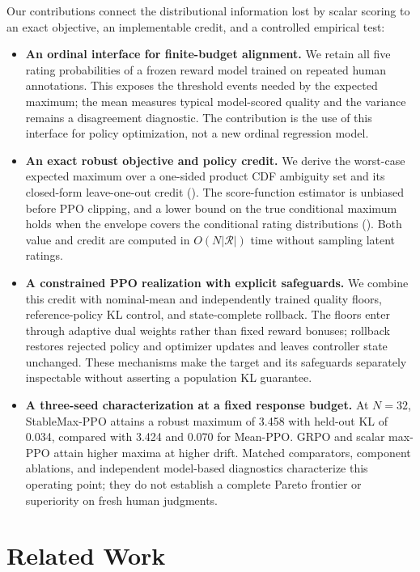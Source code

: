 \documentclass{article}
\newcommand{\method}{StableMax-PPO}
\theoremstyle{definition}
\theoremstyle{remark}
\begin{document}
Our contributions connect the distributional information lost by scalar scoring
to an exact objective, an implementable credit, and a controlled empirical test:
\begin{itemize}
\item \textbf{An ordinal interface for finite-budget alignment.}
We retain all five rating probabilities of a frozen reward model trained on
repeated human annotations. This exposes the threshold events needed by the
expected maximum; the mean measures typical model-scored quality and the
variance remains a disagreement diagnostic. The contribution is the use of
this interface for policy optimization, not a new ordinal regression model.

\item \textbf{An exact robust objective and policy credit.}
We derive the worst-case expected maximum over a one-sided product CDF
ambiguity set and its closed-form leave-one-out credit
(). The score-function estimator is
unbiased before PPO clipping, and a lower bound on the true conditional maximum
holds when the envelope covers the conditional rating distributions
(). Both value and credit are computed in
\(O(N|\mathcal R|)\) time without sampling latent ratings.

\item \textbf{A constrained PPO realization with explicit safeguards.}
We combine this credit with nominal-mean and independently trained quality
floors, reference-policy KL control, and state-complete rollback. The floors
enter through adaptive dual weights rather than fixed reward bonuses;
rollback restores rejected policy and optimizer updates and leaves controller
state unchanged. These mechanisms make the target and its safeguards
separately inspectable without asserting a population KL guarantee.

\item \textbf{A three-seed characterization at a fixed response budget.}
At \(N=32\), \method{} attains a robust maximum of 3.458 with held-out KL
of 0.034, compared with 3.424 and 0.070 for Mean-PPO. GRPO and scalar
max-PPO attain higher maxima at higher drift. Matched comparators, component
ablations, and independent model-based diagnostics characterize this operating
point; they do not establish a complete Pareto frontier or superiority on
fresh human judgments.
\end{itemize}

\section{Related Work}
\label{sec:related}
\end{document}
